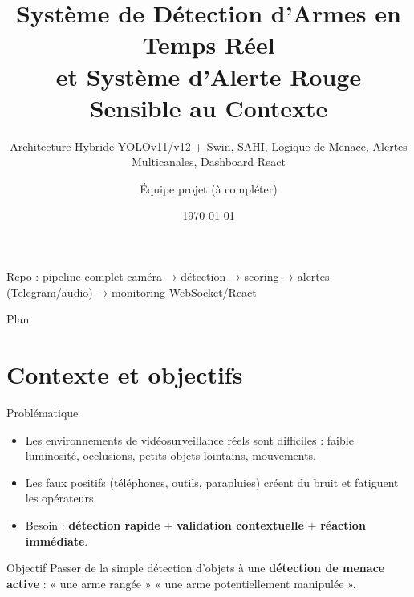 \documentclass[aspectratio=169,11pt]{beamer}
\title[Détection d'armes temps réel]{Système de Détection d'Armes en Temps Réel\\\small et Système d'Alerte Rouge Sensible au Contexte}
\subtitle{Architecture Hybride YOLOv11/v12 + Swin, SAHI, Logique de Menace, Alertes Multicanales, Dashboard React}
\author{\small Équipe projet (à compléter)}
\institute{\small Real-Time Weapon Detection \& Context-Aware Red Alert System (SALMAS)}
\date{\small \today}
\begin{document}
\begin{frame}
  \titlepage
  \vspace{-0.2cm}
  \begin{center}
    \footnotesize
    \textcolor{brandGray}{Repo : pipeline complet caméra → détection → scoring → alertes (Telegram/audio) → monitoring WebSocket/React}
  \end{center}
\end{frame}

\begin{frame}{Plan}
  \tableofcontents
\end{frame}

\section{Contexte et objectifs}

\begin{frame}{Problématique}
  \begin{itemize}
    \item Les environnements de vidéosurveillance réels sont difficiles : faible luminosité, occlusions, petits objets lointains, mouvements.
    \item Les faux positifs (téléphones, outils, parapluies) créent du bruit et fatiguent les opérateurs.
    \item Besoin : \textbf{détection rapide} + \textbf{validation contextuelle} + \textbf{réaction immédiate}.
  \end{itemize}

  \vspace{0.2cm}
  \begin{block}{Objectif}
    Passer de la simple détection d'objets à une \textbf{détection de menace active} :\newline
    « une arme rangée » \rightarrow{} « une arme potentiellement manipulée ».
  \end{block}
\end{frame}
\end{document}
